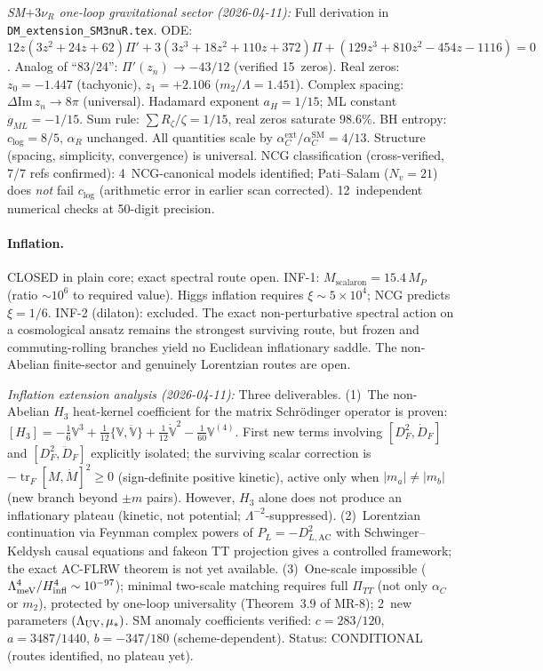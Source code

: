 \documentclass[12pt,a4paper]{article}
\begin{document}
\textit{SM$+3\nu_R$ one-loop gravitational sector (2026-04-11):}
Full derivation in \texttt{DM\_extension\_SM3nuR.tex}.
ODE: $12z(3z^2+24z+62)\Pi'+3(3z^3+18z^2+110z+372)\Pi+(129z^3+810z^2-454z-1116)=0$.
Analog of ``83/24'': $\Pi'(z_n)\to -43/12$ (verified 15~zeros).
Real zeros: $z_0=-1.447$ (tachyonic), $z_1=+2.106$ ($m_2/\Lambda=1.451$).
Complex spacing: $\Delta\mathrm{Im}\,z_n\to 8\pi$ (universal).
Hadamard exponent $a_H=1/15$; ML constant $g_{ML}=-1/15$.
Sum rule: $\sum R_\zeta/\zeta = 1/15$, real zeros saturate $98.6\%$.
BH entropy: $c_{\log}=8/5$, $\alpha_R$ unchanged.
All quantities scale by $\alpha_C^{\mathrm{ext}}/\alpha_C^{\mathrm{SM}}=4/13$.
Structure (spacing, simplicity, convergence) is universal.
NCG classification (cross-verified, 7/7 refs confirmed):
4~NCG-canonical models identified; Pati--Salam ($N_v=21$) does \emph{not}
fail $c_{\log}$ (arithmetic error in earlier scan corrected).
12~independent numerical checks at 50-digit precision.

\paragraph{Inflation.}
\textcolor{long}{CLOSED in plain core; exact spectral route open.}
INF-1: $M_{\text{scalaron}} = 15.4\,M_P$ (ratio $\sim 10^6$ to
required value).
Higgs inflation requires $\xi \sim 5 \times 10^4$; NCG predicts
$\xi = 1/6$.
INF-2 (dilaton): excluded.
The exact non-perturbative spectral action on a cosmological ansatz
remains the strongest surviving route, but frozen and commuting-rolling
branches yield no Euclidean inflationary saddle.
The non-Abelian finite-sector and genuinely Lorentzian routes are open.

\textit{Inflation extension analysis (2026-04-11):} Three deliverables.
(1)~The non-Abelian $H_3$ heat-kernel coefficient for the matrix
Schr\"odinger operator is proven:
$[H_3]=-\tfrac16\mathbb{V}^3+\tfrac1{12}\{\mathbb{V},\ddot{\mathbb{V}}\}
+\tfrac1{12}\dot{\mathbb{V}}^2-\tfrac1{60}\mathbb{V}^{(4)}$.
First new terms involving $[D_F^2,\dot D_F]$ and $[D_F^2,\ddot D_F]$
explicitly isolated; the surviving scalar correction is
$-\operatorname{tr}_F[M,\dot M]^2\ge 0$ (sign-definite positive kinetic),
active only when $|m_a|\neq|m_b|$ (new branch beyond $\pm m$ pairs).
However, $H_3$ alone does not produce an inflationary plateau (kinetic,
not potential; $\Lambda^{-2}$-suppressed).
(2)~Lorentzian continuation via Feynman complex powers of
$P_L=-D_{L,\mathrm{AC}}^2$ with Schwinger--Keldysh causal equations
and fakeon TT projection gives a controlled framework; the exact
AC-FLRW theorem is not yet available.
(3)~One-scale impossible ($\Lambda_{\mathrm{meV}}^4/H_{\rm infl}^4
\sim 10^{-97}$); minimal two-scale matching requires full $\Pi_{TT}$
(not only $\alpha_C$ or $m_2$), protected by one-loop universality
(Theorem~3.9 of MR-8); 2~new parameters $(\Lambda_{\rm UV},\mu_*)$.
SM anomaly coefficients verified: $c=283/120$, $a=3487/1440$,
$b=-347/180$ (scheme-dependent).
\textcolor{near}{Status: CONDITIONAL (routes identified, no plateau yet).}
\end{document}
